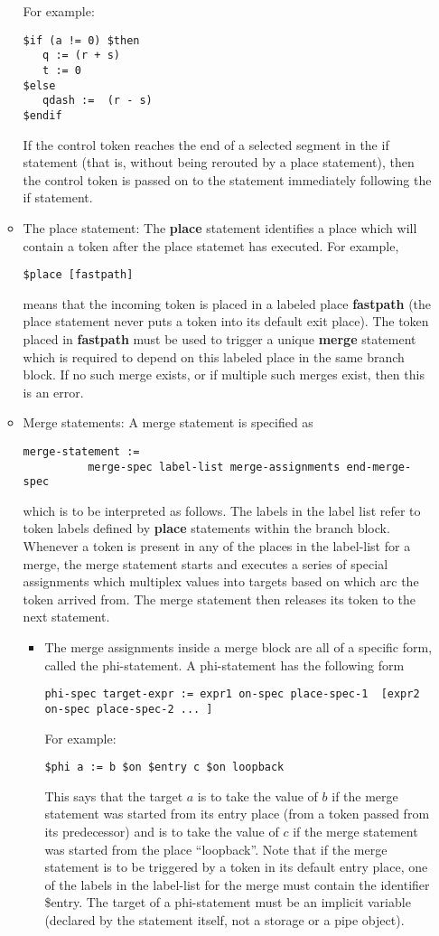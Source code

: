 \documentclass{article}
\begin{document}
\begin{itemize}
\begin{itemize}
\begin{verbatim}
\end{verbatim}
For example:
\begin{verbatim}
$if (a != 0) $then
   q := (r + s)
   t := 0
$else
   qdash :=  (r - s)
$endif
\end{verbatim}
If the control token reaches the end of a selected
segment in the if statement (that is, without being
rerouted by a place statement), then the control
token is passed on to the statement immediately
following the if statement.
\item The place statement: The {\bf place} statement
identifies a place which will contain 
a token after the place statemet has executed.  For example,
\begin{verbatim}
$place [fastpath]
\end{verbatim}%
means that the incoming token is placed in a labeled
place {\bf fastpath} (the place statement never
puts a token into its default exit place).  
The token placed in {\bf fastpath} must be used to
trigger a unique {\bf merge} statement which is required
to depend on this labeled place in the same branch
block. If no such merge exists, or if multiple such merges exist, 
then this is an error.
\item Merge statements: A merge statement is
specified as 
\begin{verbatim}
merge-statement :=
          merge-spec label-list merge-assignments end-merge-spec
\end{verbatim}
which is to be interpreted as follows.  The labels in the label list
refer to token labels defined by {\bf place}  statements within the branch block.
Whenever a token is present in any of the places in
the label-list for a merge,
the merge statement starts and executes a series of special assignments
which multiplex values into targets based on which arc the
token arrived from.  The merge statement then releases its token to
the next statement. 
\begin{itemize}
\item 
The merge assignments inside a merge block are all of a specific
form, called the phi-statement.  A phi-statement has the following
form
\begin{verbatim}
phi-spec target-expr := expr1 on-spec place-spec-1  [expr2 on-spec place-spec-2 ... ]
\end{verbatim}
For example:
\begin{verbatim}
$phi a := b $on $entry c $on loopback 
\end{verbatim}
This says that the target $a$ is to take the value of $b$ if
the merge statement was started from its entry place (from a
token passed from its predecessor) and is to take the value of $c$
if the merge statement was started from the place ``loopback''.
Note that if the merge statement is to be triggered by a
token in its default entry place, one of the labels in the
label-list for the merge must contain the identifier \$entry.
The target of a phi-statement must be an implicit variable
(declared by the statement itself, not a storage or a pipe
object).
\end{itemize}
\end{itemize}


\end{itemize}
\end{document}
